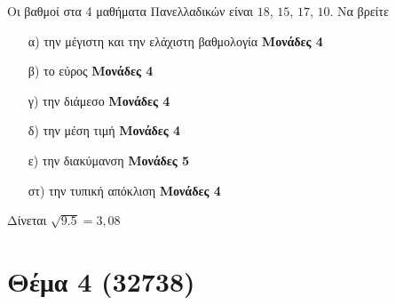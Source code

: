 \documentclass[12pt]{extarticle}
\begin{document}
Οι βαθμοί στα 4 μαθήματα Πανελλαδικών είναι $18$, $15$, $17$, $10$. Να βρείτε
\begin{enumerate}
    \item[α)] την μέγιστη και την ελάχιστη βαθμολογία \hspace*{\fill} \textbf{Μονάδες 4}
    \item[β)] το εύρος \hspace*{\fill} \textbf{Μονάδες 4}
    \item[γ)] την διάμεσο \hspace*{\fill} \textbf{Μονάδες 4}
    \item[δ)] την μέση τιμή \hspace*{\fill} \textbf{Μονάδες 4}
    \item[ε)] την διακύμανση \hspace*{\fill} \textbf{Μονάδες 5}
    \item[στ)] την τυπική απόκλιση \hspace*{\fill} \textbf{Μονάδες 4}
\end{enumerate}
Δίνεται $\sqrt{9.5}=3,08$

\section*{Θέμα 4 (32738)}
\noindent
\end{document}
